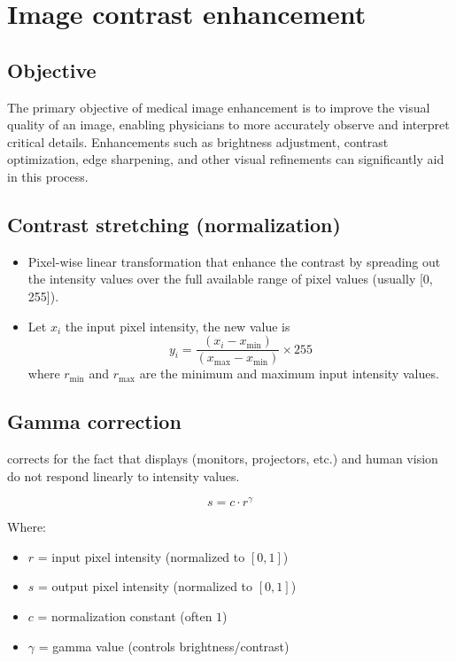 \chapter{Image contrast enhancement}

\section{Objective}
The primary objective of medical image enhancement is to improve the
visual quality of an image, enabling physicians to more accurately
observe and interpret critical details. Enhancements such as
brightness adjustment, contrast optimization, edge sharpening, and
other visual refinements can significantly aid in this process.

\section{Contrast stretching (normalization)}
\begin{itemize}
\item Pixel-wise linear transformation that enhance the contrast by spreading out the
  intensity values over the full available range of pixel values (usually [0, 255]).
\item Let $x_i$ the input pixel intensity, the new value is
  \begin{equation}
    y_i = \frac{(x_i - x_{\min})}{(x_{\max} - x_{\min})} \times 255
  \end{equation}
  where $r_{\text{min}}$ and $r_{\text{max}}$ are the minimum and
  maximum input intensity values.
\end{itemize}

\section{Gamma correction}

corrects for the fact that displays (monitors, projectors, etc.) and human vision do not respond linearly to intensity values.

\begin{equation}
s = c \cdot r^{\gamma}
\end{equation}

Where:
\begin{itemize}
    \item $r$ = input pixel intensity (normalized to $[0,1]$)
    \item $s$ = output pixel intensity (normalized to $[0,1]$)
    \item $c$ = normalization constant (often $1$)
    \item $\gamma$ = gamma value (controls brightness/contrast)
\end{itemize}


